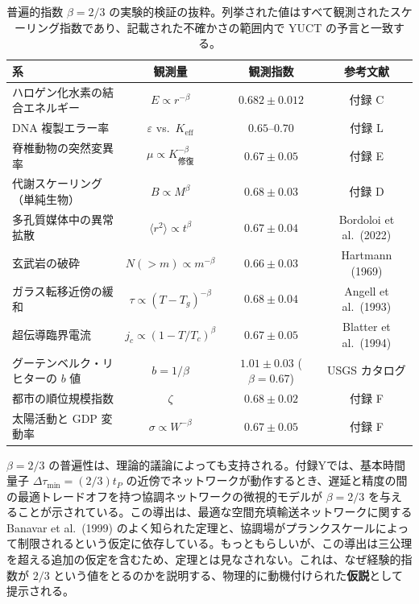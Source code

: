 \documentclass[12pt,a4paper]{article}
\begin{document}
	\begin{table}[H]
		\centering
		\caption{普遍的指数 \(\beta = 2/3\) の実験的検証の抜粋。列挙された値はすべて観測されたスケーリング指数であり、記載された不確かさの範囲内で YUCT の予言と一致する。}
		\label{tab:beta-evidence}
		\small
		\begin{tabular}{l c c c}
			\toprule
			\textbf{系} & \textbf{観測量} & \textbf{観測指数} & \textbf{参考文献} \\
			\midrule
			ハロゲン化水素の結合エネルギー & \(E \propto r^{-\beta}\) & \(0.682 \pm 0.012\) & 付録 C \\
			DNA 複製エラー率 & \(\varepsilon\) vs.\ \(K_{\mathrm{eff}}\) & \(0.65\text{--}0.70\) & 付録 L \\
			脊椎動物の突然変異率 & \(\mu \propto K_{\text{修復}}^{-\beta}\) & \(0.67 \pm 0.05\) & 付録 E \\
			代謝スケーリング（単純生物） & \(B \propto M^{\beta}\) & \(0.68 \pm 0.03\) & 付録 D \\
			多孔質媒体中の異常拡散 & \(\langle r^2 \rangle \propto t^{\beta}\) & \(0.67 \pm 0.04\) & Bordoloi et al.\ (2022) \\
			玄武岩の破砕 & \(N(>m) \propto m^{-\beta}\) & \(0.66 \pm 0.03\) & Hartmann (1969) \\
			ガラス転移近傍の緩和 & \(\tau \propto (T-T_g)^{-\beta}\) & \(0.68 \pm 0.04\) & Angell et al.\ (1993) \\
			超伝導臨界電流 & \(j_c \propto (1-T/T_c)^{\beta}\) & \(0.67 \pm 0.05\) & Blatter et al.\ (1994) \\
			グーテンベルク・リヒターの \(b\) 値 & \(b = 1/\beta\) & \(1.01 \pm 0.03\) (\(\beta=0.67\)) & USGS カタログ \\
			都市の順位規模指数 & \(\zeta\) & \(0.68 \pm 0.02\) & 付録 F \\
			太陽活動と GDP 変動率 & \(\sigma \propto W^{-\beta}\) & \(0.67 \pm 0.05\) & 付録 F \\
			\bottomrule
		\end{tabular}
	\end{table}
	
	\(\beta = 2/3\) の普遍性は、理論的議論によっても支持される。付録Yでは、基本時間量子 \(\Delta\tau_{\min} = (2/3) t_P\) の近傍でネットワークが動作するとき、遅延と精度の間の最適トレードオフを持つ協調ネットワークの微視的モデルが \(\beta = 2/3\) を与えることが示されている。この導出は、最適な空間充填輸送ネットワークに関する Banavar et al.\ (1999) のよく知られた定理と、協調場がプランクスケールによって制限されるという仮定に依存している。もっともらしいが、この導出は三公理を超える追加の仮定を含むため、定理とは見なされない。これは、なぜ経験的指数が \(2/3\) という値をとるのかを説明する、物理的に動機付けられた\textbf{仮説}として提示される。
	
\end{document}
